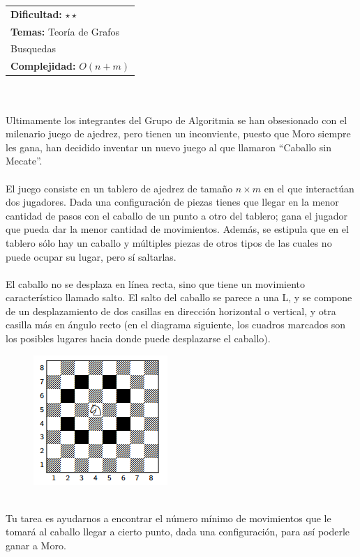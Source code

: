 \documentclass[12pt]{article}
\begin{document}
{{{\hfill
\begin{tabular}{@{}l@{}}
\textbf{Dificultad:} $\star\star$ \\
\textbf{Temas:} Teoría de Grafos \\
Busquedas \\
\textbf{Complejidad:} $O(n+m)$
\end{tabular}
\\
\\
Ultimamente los integrantes del Grupo de Algoritmia se han obsesionado con el milenario juego de ajedrez, pero tienen un inconviente, puesto que Moro siempre les gana, han decidido inventar un nuevo juego al que llamaron “Caballo sin Mecate”.\\
\\El juego consiste en un tablero de ajedrez de tamaño $n × m$ en el que interactúan dos jugadores. Dada una configuración de piezas tienes que llegar en la menor cantidad de pasos con el caballo de un punto a otro del tablero; gana el jugador que pueda dar la menor cantidad de movimientos. Además, se estipula que en el tablero sólo hay un caballo y múltiples piezas de otros tipos de las cuales no puede ocupar su lugar, pero sí saltarlas.\\
\\El caballo no se desplaza en línea recta, sino que tiene un movimiento característico llamado salto. El salto del caballo se parece a una L, y se compone de un desplazamiento de dos casillas en dirección horizontal o vertical, y otra casilla más en ángulo recto (en el diagrama siguiente, los cuadros marcados son los posibles lugares hacia donde puede desplazarse el caballo).
\begin{figure}[h!] 
\begin{center} 
\includegraphics[scale = 1]{cab.PNG}\hspace{50mm}  
\end{center} 
\end{figure}
\\Tu tarea es ayudarnos a encontrar el número mínimo de movimientos que le tomará al caballo llegar a cierto punto, dada una configuración, para así poderle ganar a Moro.
}}}
\end{document}
